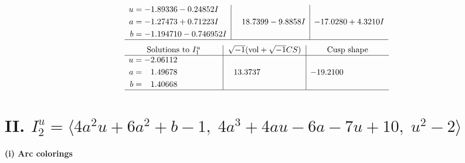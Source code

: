 \documentclass[1p]{elsarticle_modified}
\theoremstyle{definition}
\newcommand{\I}{\sqrt{-1}}
\begin{document}
$$\begin{array}{c|c|c}
\begin{aligned}
u &= -1.89336 - 0.24852 I \\
a &= -1.27473 + 0.71223 I \\
b &= -1.194710 - 0.746952 I\end{aligned}
 & \phantom{-}18.7399 - 9.8858 I & -17.0280 + 4.3210 I\\
 \hline 
 \end{array}$$\newpage$$\begin{array}{c|c|c}  
\text{Solutions to }I^u_{1}& \I (\text{vol} + \sqrt{-1}CS) & \text{Cusp shape}\\
 \hline 
\begin{aligned}
u &= -2.06112\phantom{ +0.000000I} \\
a &= \phantom{-}1.49678\phantom{ +0.000000I} \\
b &= \phantom{-}1.40668\phantom{ +0.000000I}\end{aligned}
 & \phantom{-}13.3737\phantom{ +0.000000I} & -19.2100\phantom{ +0.000000I}\\
 \hline 
 \end{array}$$\newpage\newpage\renewcommand{\arraystretch}{1}
\centering \section*{II. $I^u_{2}= \langle 4 a^2 u+6 a^2+b-1,\;4 a^3+4 a u-6 a-7 u+10,\;u^2-2 \rangle$}
\flushleft \textbf{(i) Arc colorings}\\
\end{document}
